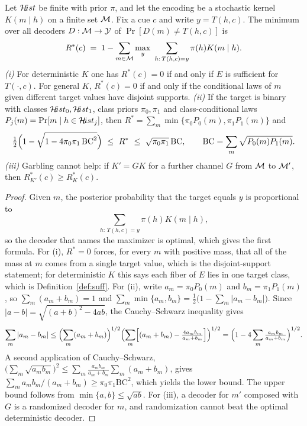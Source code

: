 \begin{extension}\label{ext:bayesrisk}
Let $\mathcal{H}\!ist$ be finite with prior $\pi$, and let the encoding be a stochastic kernel $K(m\mid h)$ on a finite set $\mathcal{M}$. Fix a cue $c$ and write $y=T(h,c)$. The minimum over all decoders $D:\mathcal{M}\to\mathcal{Y}$ of $\Pr[D(m)\ne T(h,c)]$ is
\begin{equation}
R^\ast(c)\;=\;1-\sum_{m\in\Mem}\max_{y}\ \sum_{h:\,T(h,c)=y}\pi(h)K(m\mid h).
\end{equation}
\emph{(i)} For deterministic $K$ one has $R^\ast(c)=0$ if and only if $E$ is sufficient for $T(\cdot,c)$. For general $K$, $R^\ast(c)=0$ if and only if the conditional laws of $m$ given different target values have disjoint supports. \emph{(ii)} If the target is binary with classes $\mathcal{H}\!ist_0,\mathcal{H}\!ist_1$, class priors $\pi_0,\pi_1$ and class-conditional laws $P_j(m)=\Pr[m\mid h\in\mathcal{H}\!ist_j]$, then $R^\ast=\sum_m\min\{\pi_0P_0(m),\pi_1P_1(m)\}$ and
\begin{equation}\label{eq:bcbound}
\tfrac12\Bigl(1-\sqrt{1-4\pi_0\pi_1\,\mathrm{BC}^2}\Bigr)\ \le\ R^\ast\ \le\ \sqrt{\pi_0\pi_1}\,\mathrm{BC},\qquad \mathrm{BC}=\sum_m\sqrt{P_0(m)P_1(m)}.
\end{equation}
\emph{(iii)} Garbling cannot help: if $K'=GK$ for a further channel $G$ from $\mathcal{M}$ to $\mathcal{M}'$, then $R^\ast_{K'}(c)\ge R^\ast_K(c)$.
\end{extension}

\begin{proof}
Given $m$, the posterior probability that the target equals $y$ is proportional to
\begin{equation*}
\sum_{h:\,T(h,c)=y}\pi(h)K(m\mid h),
\end{equation*}
so the decoder that names the maximizer is optimal, which gives the first formula. For (i), $R^\ast=0$ forces, for every $m$ with positive mass, that all of the mass at $m$ comes from a single target value, which is the disjoint-support statement; for deterministic $K$ this says each fiber of $E$ lies in one target class, which is Definition~\ref{def:suff}. For (ii), write $a_m=\pi_0P_0(m)$ and $b_m=\pi_1P_1(m)$, so $\sum_m(a_m+b_m)=1$ and $\sum_m\min\{a_m,b_m\}=\tfrac12\bigl(1-\sum_m|a_m-b_m|\bigr)$. Since $|a-b|=\sqrt{(a+b)^2-4ab}$, the Cauchy--Schwarz inequality gives
\begin{equation}
\sum_m|a_m-b_m|\le\Bigl(\sum_m(a_m+b_m)\Bigr)^{1/2}\Bigl(\sum_m\Bigl[(a_m+b_m)-\tfrac{4a_mb_m}{a_m+b_m}\Bigr]\Bigr)^{1/2}=\Bigl(1-4\sum_m\tfrac{a_mb_m}{a_m+b_m}\Bigr)^{1/2}.
\end{equation}
A second application of Cauchy--Schwarz, $\bigl(\sum_m\sqrt{a_mb_m}\bigr)^2\le\sum_m\tfrac{a_mb_m}{a_m+b_m}\sum_m(a_m+b_m)$, gives $\sum_m a_mb_m/(a_m+b_m)\ge\pi_0\pi_1\mathrm{BC}^2$, which yields the lower bound. The upper bound follows from $\min\{a,b\}\le\sqrt{ab}$. For (iii), a decoder for $m'$ composed with $G$ is a randomized decoder for $m$, and randomization cannot beat the optimal deterministic decoder.
\end{proof}

